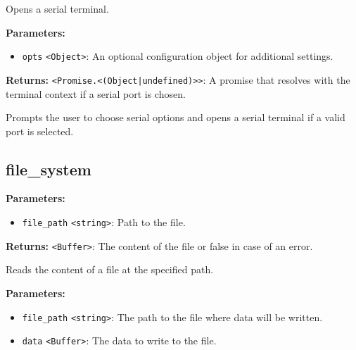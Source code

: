 \documentclass[12pt,a4paper]{article}
\begin{document}
\noindent Opens a serial terminal.

\vspace{5mm}
\noindent {}


\noindent \textbf{Parameters:}
\begin{itemize}
  \item \texttt{opts} \texttt{<Object>}: An optional configuration object for additional settings.
\end{itemize}

\noindent \textbf{Returns:} \texttt{<Promise.<(Object|undefined)>>}: A promise that resolves with the terminal context if a serial port is chosen.

\noindent Prompts the user to choose serial options and opens a serial terminal if a valid port is selected.


\subsection{file\_system}
\vspace{5mm}
\noindent {}


\noindent \textbf{Parameters:}
\begin{itemize}
  \item \texttt{file\_path} \texttt{<string>}: Path to the file.
\end{itemize}

\noindent \textbf{Returns:} \texttt{<Buffer>}: The content of the file or false in case of an error.

\noindent Reads the content of a file at the specified path.

\vspace{5mm}
\noindent {}


\noindent \textbf{Parameters:}
\begin{itemize}
  \item \texttt{file\_path} \texttt{<string>}: The path to the file where data will be written.
  \item \texttt{data} \texttt{<Buffer>}: The data to write to the file.
\end{itemize}
\end{document}
